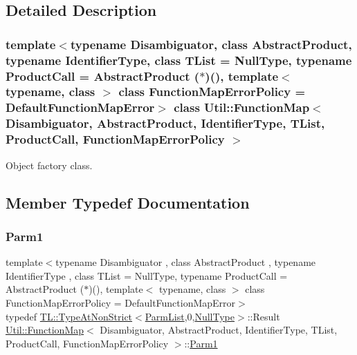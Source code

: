 \subsection{Detailed Description}
\subsubsection*{template$<$typename Disambiguator, class Abstract\+Product, typename Identifier\+Type, class T\+List = Null\+Type, typename Product\+Call = Abstract\+Product ($\ast$)(), template$<$ typename, class $>$ class Function\+Map\+Error\+Policy = Default\+Function\+Map\+Error$>$\newline
class Util\+::\+Function\+Map$<$ Disambiguator, Abstract\+Product, Identifier\+Type, T\+List, Product\+Call, Function\+Map\+Error\+Policy $>$}

Object factory class. 

\subsection{Member Typedef Documentation}
\mbox{\label{classUtil_1_1FunctionMap_a7b842c0101fae8075e8b21c90ede63cb}} 
\subsubsection{\texorpdfstring{Parm1}{Parm1}\hspace{0.1cm}{\footnotesize\ttfamily [1/3]}}
{\footnotesize\ttfamily template$<$typename Disambiguator , class Abstract\+Product , typename Identifier\+Type , class T\+List  = Null\+Type, typename Product\+Call  = Abstract\+Product ($\ast$)(), template$<$ typename, class $>$ class Function\+Map\+Error\+Policy = Default\+Function\+Map\+Error$>$ \\
typedef \mbox{\hyperlink{structUtil_1_1TL_1_1TypeAtNonStrict}{T\+L\+::\+Type\+At\+Non\+Strict}}$<$\mbox{\hyperlink{classUtil_1_1FunctionMap_a6cf0e6766cf6f20642ba61c4994bb477}{Parm\+List}},0,\mbox{\hyperlink{classUtil_1_1NullType}{Null\+Type}}$>$\+::Result \mbox{\hyperlink{classUtil_1_1FunctionMap}{Util\+::\+Function\+Map}}$<$ Disambiguator, Abstract\+Product, Identifier\+Type, T\+List, Product\+Call, Function\+Map\+Error\+Policy $>$\+::\mbox{\hyperlink{classUtil_1_1FunctionMap_a7b842c0101fae8075e8b21c90ede63cb}{Parm1}}}

